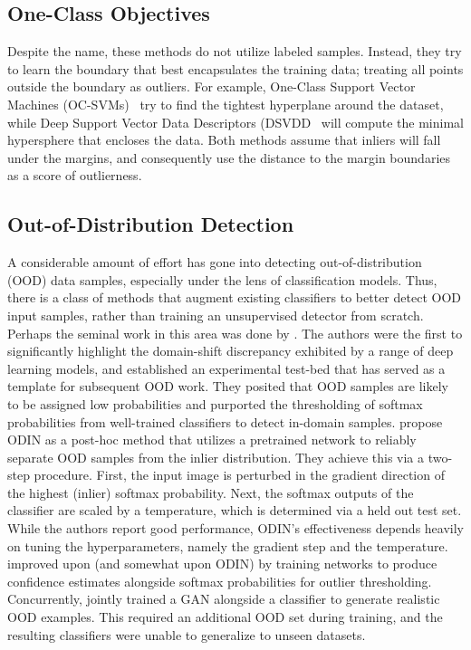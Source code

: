\subsection*{One-Class Objectives}

Despite the name, these methods do not utilize labeled samples. Instead, they try to learn the boundary that best encapsulates the training data; treating all points outside the boundary as outliers. For example, One-Class Support Vector Machines (OC-SVMs)~\cite{ocsvm} try to find the tightest hyperplane around the dataset, while Deep Support Vector Data Descriptors (DSVDD~\cite{pmlr-v80-ruff18a}  will compute the minimal hypersphere that encloses the data. Both methods assume that inliers will fall under the margins, and consequently use the distance to the margin boundaries as a score of outlierness. 

\subsection{Out-of-Distribution Detection}
A considerable amount of effort has gone into detecting out-of-distribution (OOD) data samples, especially under the lens of classification models. Thus, there is a class of methods that augment existing classifiers to better detect OOD input samples, rather than training an unsupervised detector from scratch. Perhaps the seminal work in this area was done by \citet{Hendrycks2019}. The authors were the first to significantly highlight the domain-shift discrepancy exhibited by a range of deep learning models, and established an experimental test-bed that has served as a template for subsequent OOD work. They posited that OOD samples are likely to be assigned low probabilities and purported the thresholding of softmax probabilities from well-trained classifiers to detect in-domain samples. \cite{Liang2017} propose ODIN as a post-hoc method that utilizes a pretrained network to reliably separate OOD samples from the inlier distribution. They achieve this via a two-step procedure. First, the input image is perturbed in the gradient direction of the highest (inlier) softmax probability. Next, the softmax outputs of the classifier are scaled by a temperature, which is determined via a held out test set. While the authors report good performance, ODIN's effectiveness depends heavily on tuning the hyperparameters, namely the gradient step and the temperature. \cite{devries2018learning} improved upon \cite{Hendrycks2019} (and somewhat upon ODIN) by training networks to produce confidence estimates alongside softmax probabilities for outlier thresholding. Concurrently, \cite{Lee2018} jointly trained a GAN alongside a classifier to generate realistic OOD examples. This required an additional OOD set during training, and the resulting classifiers were unable to generalize to unseen datasets.


